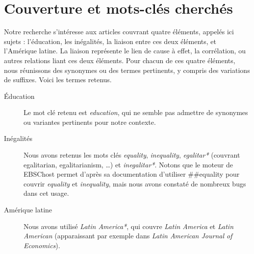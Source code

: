 \documentclass[pagesize, twoside=off, bibliography=totoc, DIV=calc, fontsize=12pt, a4paper, french]{scrartcl}
\begin{document}
\section{Couverture et mots-clés cherchés}
Notre recherche s’intéresse aux articles couvrant quatre éléments, appelés ici \og{}sujets\fg{} : l’éducation, les inégalités, la liaison entre ces deux éléments, et l’Amérique latine. La liaison représente le lien de cause à effet, la corrélation, ou autres relations liant ces deux éléments. Pour chacun de ces quatre éléments, nous réunissons des synonymes ou des termes pertinents, y compris des variations de suffixes. Voici les termes retenus.

\begin{description}
  \item[Éducation] Le mot clé retenu est \emph{education}, qui ne semble pas admettre de synonymes ou variantes pertinents pour notre contexte.
  \item[Inégalités] Nous avons retenus les mots clés \emph{equality}, \emph{inequality}, \emph{egalitar*} (couvrant egalitarian, egalitarianism, …) et \emph{inegalitar*}. Notons que le moteur de EBSChost permet d’après sa documentation \citep{ebscohost_searching_2024} d’utiliser \#\#equality pour couvrir \emph{equality} et \emph{inequality}, mais nous avons constaté de nombreux bugs dans cet usage.
  \item[Amérique latine] Nous avons utilisé \emph{Latin America*}, qui couvre \emph{Latin America} et \emph{Latin American} (apparaissant par exemple dans \emph{Latin American Journal of Economics}). 
\end{description}


\end{document}
